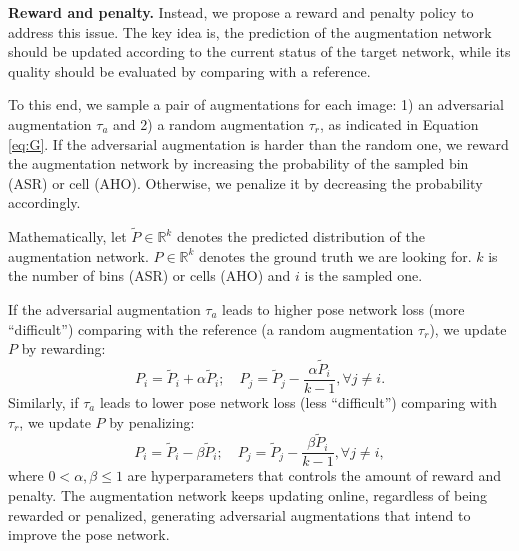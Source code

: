 \documentclass[10pt,twocolumn,letterpaper]{article}
\begin{document}
{\bf Reward and penalty.} Instead, we propose a reward and penalty policy to address this issue. The key idea is, the prediction of the augmentation network should be updated according to the current status of the target network, while its quality should be evaluated by comparing with a reference. 

To this end, we sample a pair of augmentations for each image: 1) an adversarial augmentation $\tau_a$ and 2) a random augmentation $\tau_r$, as indicated in Equation \eqref{eq:G}. If the adversarial augmentation is harder than the random one, we reward the augmentation network by increasing the probability of the sampled bin (ASR) or cell (AHO). Otherwise, we penalize it by decreasing the probability accordingly.


Mathematically, let $\tilde{P} \in \mathbb{R}^k$ denotes the predicted distribution of the augmentation network. $P \in \mathbb{R}^k$ denotes the ground truth we are looking for. $k$ is the number of bins (ASR) or cells (AHO) and $i$ is the sampled one.

If the adversarial augmentation $\tau_a$ leads to higher pose network loss (more ``difficult'') comparing with the reference (a random augmentation $\tau_r$), we update $P$ by rewarding:
\begin{equation} \label{eq:reward}
P_{i} = \tilde{P}_{i} + \alpha \tilde{P}_i; \quad P_{j} = \tilde{P}_{j} - \frac{\alpha \tilde{P}_i}{k-1}, \forall j \neq i.
\end{equation}
Similarly, if $\tau_a$ leads to lower pose network loss (less ``difficult'') comparing with $\tau_r$, we update $P$ by penalizing:
\begin{equation} \label{eq:penalty}
P_{i} = \tilde{P}_{i} - \beta \tilde{P}_i; \quad P_{j} = \tilde{P}_{j} - \frac{\beta \tilde{P}_i}{k-1}, \forall j \neq i,
\end{equation}
where $0 < \alpha, \beta \leq 1$ are hyperparameters that controls the amount of reward and penalty. The augmentation network keeps updating online, regardless of being rewarded or penalized, generating adversarial augmentations that intend to improve the pose network. 
\end{document}
